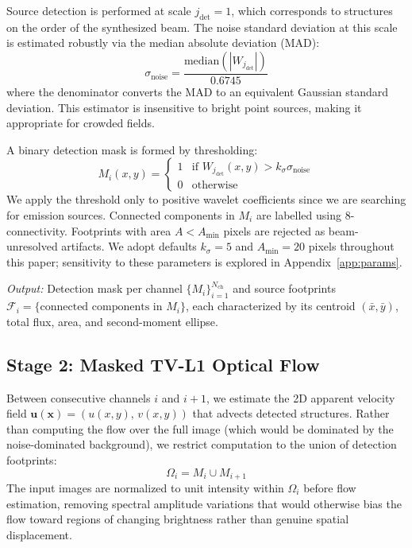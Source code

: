 \documentclass{aa}
\begin{document}
Source detection is performed at scale $j_{\mathrm{det}} = 1$, which corresponds to structures on the order of the synthesized beam. The noise standard deviation at this scale is estimated robustly via the median absolute deviation (MAD):
\begin{equation}
  \sigma_{\mathrm{noise}} = \frac{\mathrm{median}(|W_{j_{\mathrm{det}}}|)}{0.6745}
\end{equation}
where the denominator converts the MAD to an equivalent Gaussian standard deviation. This estimator is insensitive to bright point sources, making it appropriate for crowded fields.

A binary detection mask is formed by thresholding:
\begin{equation}
  M_i(x,y) = \begin{cases} 1 & \text{if } W_{j_{\mathrm{det}}}(x,y) > k_{\sigma} \sigma_{\mathrm{noise}} \\ 0 & \text{otherwise} \end{cases}
\end{equation}
We apply the threshold only to positive wavelet coefficients since we are searching for emission sources. Connected components in $M_i$ are labelled using 8-connectivity. Footprints with area $A < A_{\mathrm{min}}$ pixels are rejected as beam-unresolved artifacts. We adopt defaults $k_{\sigma} = 5$ and $A_{\mathrm{min}} = 20$ pixels throughout this paper; sensitivity to these parameters is explored in Appendix~\ref{app:params}.

\textit{Output:} Detection mask per channel $\{M_i\}_{i=1}^{N_{\mathrm{ch}}}$ and source footprints $\mathcal{F}_i = \{\text{connected components in } M_i\}$, each characterized by its centroid $(\bar{x}, \bar{y})$, total flux, area, and second-moment ellipse.

\subsection{Stage 2: Masked TV-L1 Optical Flow}
\label{sec:method_flow}

Between consecutive channels $i$ and $i+1$, we estimate the 2D apparent velocity field $\mathbf{u}(\mathbf{x}) = (u(x,y),\, v(x,y))$ that advects detected structures. Rather than computing the flow over the full image (which would be dominated by the noise-dominated background), we restrict computation to the union of detection footprints:
\begin{equation}
  \Omega_i = M_i \cup M_{i+1}
\end{equation}
The input images are normalized to unit intensity within $\Omega_i$ before flow estimation, removing spectral amplitude variations that would otherwise bias the flow toward regions of changing brightness rather than genuine spatial displacement.
\end{document}
